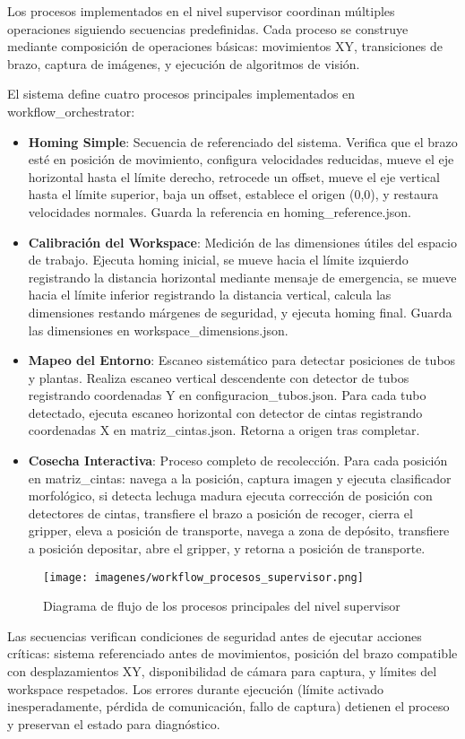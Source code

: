 Los procesos implementados en el nivel supervisor coordinan múltiples operaciones siguiendo secuencias predefinidas. Cada proceso se construye mediante composición de operaciones básicas: movimientos XY, transiciones de brazo, captura de imágenes, y ejecución de algoritmos de visión.

El sistema define cuatro procesos principales implementados en workflow\_orchestrator:

\begin{itemize}
    \item \textbf{Homing Simple}: Secuencia de referenciado del sistema. Verifica que el brazo esté en posición de movimiento, configura velocidades reducidas, mueve el eje horizontal hasta el límite derecho, retrocede un offset, mueve el eje vertical hasta el límite superior, baja un offset, establece el origen (0,0), y restaura velocidades normales. Guarda la referencia en homing\_reference.json.

    \item \textbf{Calibración del Workspace}: Medición de las dimensiones útiles del espacio de trabajo. Ejecuta homing inicial, se mueve hacia el límite izquierdo registrando la distancia horizontal mediante mensaje de emergencia, se mueve hacia el límite inferior registrando la distancia vertical, calcula las dimensiones restando márgenes de seguridad, y ejecuta homing final. Guarda las dimensiones en workspace\_dimensions.json.

    \item \textbf{Mapeo del Entorno}: Escaneo sistemático para detectar posiciones de tubos y plantas. Realiza escaneo vertical descendente con detector de tubos registrando coordenadas Y en configuracion\_tubos.json. Para cada tubo detectado, ejecuta escaneo horizontal con detector de cintas registrando coordenadas X en matriz\_cintas.json. Retorna a origen tras completar.

    \item \textbf{Cosecha Interactiva}: Proceso completo de recolección. Para cada posición en matriz\_cintas: navega a la posición, captura imagen y ejecuta clasificador morfológico, si detecta lechuga madura ejecuta corrección de posición con detectores de cintas, transfiere el brazo a posición de recoger, cierra el gripper, eleva a posición de transporte, navega a zona de depósito, transfiere a posición depositar, abre el gripper, y retorna a posición de transporte.
\end{itemize}

\begin{figure}[H]
    \centering
    \texttt{[image: imagenes/workflow\_procesos\_supervisor.png]}
    \caption{Diagrama de flujo de los procesos principales del nivel supervisor}
    \label{fig:workflow_procesos_supervisor}
\end{figure}

Las secuencias verifican condiciones de seguridad antes de ejecutar acciones críticas: sistema referenciado antes de movimientos, posición del brazo compatible con desplazamientos XY, disponibilidad de cámara para captura, y límites del workspace respetados. Los errores durante ejecución (límite activado inesperadamente, pérdida de comunicación, fallo de captura) detienen el proceso y preservan el estado para diagnóstico.